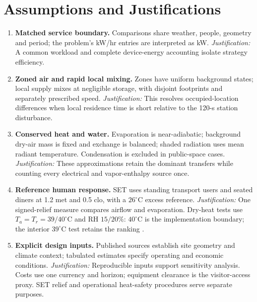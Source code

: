 \section{Assumptions and Justifications}
\begingroup\setlength{\intextsep}{4pt}
\label{sec:assumptions}
\begin{enumerate}[leftmargin=*,itemsep=2pt,topsep=2pt,label=\textbf{A\arabic*.}]
\item \textbf{Matched service boundary.} Comparisons share weather, people, geometry and period; the problem's kW/hr entries are interpreted as kW. \textit{Justification:} A common workload and complete device-energy accounting isolate strategy efficiency.
\item \textbf{Zoned air and rapid local mixing.} Zones have uniform background states; local supply mixes at negligible storage, with disjoint footprints and separately prescribed speed. \textit{Justification:} This resolves occupied-location differences when local residence time is short relative to the 120-s station disturbance.
\item \textbf{Conserved heat and water.} Evaporation is near-adiabatic; background dry-air mass is fixed and exchange is balanced; shaded radiation uses mean radiant temperature. Condensation is excluded in public-space cases. \textit{Justification:} These approximations retain the dominant transfers while counting every electrical and vapor-enthalpy source once.
\item \textbf{Reference human response.} SET uses standing transport users and seated diners at 1.2 met and 0.5 clo, with a $26^\circ$C excess reference. \textit{Justification:} One signed-relief measure compares airflow and evaporation. Dry-heat tests use $T_a=T_r=39/40^\circ$C and RH $15/20\%$: $40^\circ$C is the implementation boundary; the interior $39^\circ$C test retains the ranking \cite{pythermal}.
\item \textbf{Explicit design inputs.} Published sources establish site geometry and climate context; tabulated estimates specify operating and economic conditions. \textit{Justification:} Reproducible inputs support sensitivity analysis. Costs use one currency and horizon; equipment clearance is the visitor-access proxy. SET relief and operational heat-safety procedures serve separate purposes.
\end{enumerate}


